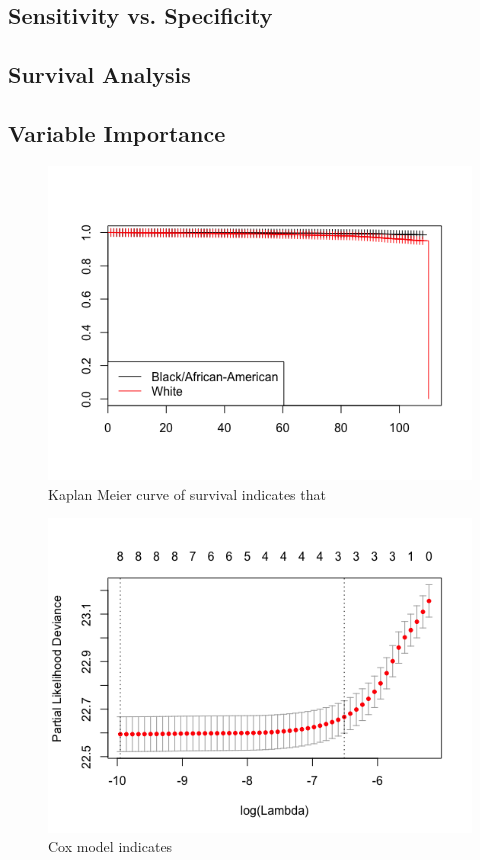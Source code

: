 \documentclass[twoside,10.5pt]{article}
\begin{document}
\subsection{Sensitivity vs. Specificity}

\subsection{Survival Analysis}

\subsection{Variable Importance}


\begin{figure}[htp]
\centering
\includegraphics[width=12cm]{images/Race_KaplanMeier.png}
\caption{Kaplan Meier curve of survival indicates that }
\label{fig:lion}
\end{figure}

\begin{figure}[htp]
\centering
\includegraphics[width=12cm]{images/Coxmodel.png}
\caption{Cox model indicates}
\label{fig:lion}
\end{figure}
\end{document}
